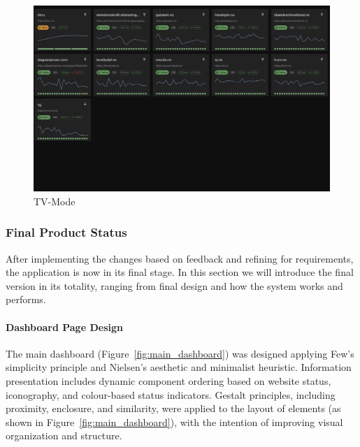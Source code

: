 \begin{figure}[H]
    \centering
    \includegraphics[width=0.75\linewidth]{figures/tv-mode.png}
    \caption{TV-Mode}
    \label{fig:tv-mode}
\end{figure}





%



\subsubsection{Final Product Status}
After implementing the changes based on feedback and refining for requirements, the application is now in its final stage. In this section we will introduce the final version in its totality, ranging from final design and how the system works and performs.


\paragraph{Dashboard Page Design}
The main dashboard (Figure~\ref{fig:main_dashboard}) was designed applying Few’s simplicity principle and Nielsen’s aesthetic and minimalist heuristic. Information presentation includes dynamic component ordering based on website status, iconography, and colour-based status indicators. Gestalt principles, including proximity, enclosure, and similarity, were applied to the layout of elements (as shown in Figure~\ref{fig:main_dashboard}), with the intention of improving visual organization and structure.

